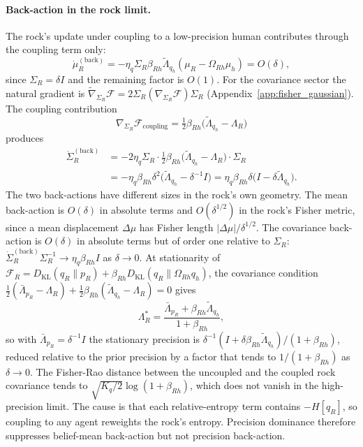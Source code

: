 \paragraph{Back-action in the rock limit.} The rock's update under coupling to a low-precision human contributes through the coupling term only:
\begin{equation}
\dot{\mu}_R^{(\mathrm{back})} = -\eta_q \Sigma_R \beta_{Rh} \tilde{\Lambda}_{q_h}(\mu_R - \Omega_{Rh}\mu_h) = O(\delta),
\label{eq:rock_back_mu}
\end{equation}
since $\Sigma_R = \delta I$ and the remaining factor is $O(1)$. For the covariance sector the natural gradient is $\tilde{\nabla}_{\Sigma_R}\mathcal{F} = 2\Sigma_R(\nabla_{\Sigma_R}\mathcal{F})\Sigma_R$ (Appendix~\ref{app:fisher_gaussian}). The coupling contribution
\begin{equation}
\nabla_{\Sigma_R}\mathcal{F}_{\mathrm{coupling}} = \tfrac{1}{2}\beta_{Rh}\big(\tilde{\Lambda}_{q_h} - \Lambda_R\big)
\end{equation}
produces
\begin{equation}
\begin{aligned}
\dot{\Sigma}_R^{(\mathrm{back})} &= -2\eta_q \Sigma_R \cdot \tfrac{1}{2}\beta_{Rh}\big(\tilde{\Lambda}_{q_h} - \Lambda_R\big)\cdot \Sigma_R \\
&= -\eta_q \beta_{Rh} \delta^2 \big(\tilde{\Lambda}_{q_h} - \delta^{-1}I\big) = \eta_q\beta_{Rh}\delta\big(I - \delta\tilde{\Lambda}_{q_h}\big).
\end{aligned}
\label{eq:rock_back_sigma}
\end{equation}
The two back-actions have different sizes in the rock's own geometry. The mean back-action is $O(\delta)$ in absolute terms and $O(\delta^{1/2})$ in the rock's Fisher metric, since a mean displacement $\Delta\mu$ has Fisher length $|\Delta\mu|/\delta^{1/2}$. The covariance back-action is $O(\delta)$ in absolute terms but of order one relative to $\Sigma_R$: $\dot{\Sigma}_R^{(\mathrm{back})}\Sigma_R^{-1} \to \eta_q\beta_{Rh}I$ as $\delta \to 0$. At stationarity of $\mathcal{F}_R = D_{\mathrm{KL}}(q_R\|p_R) + \beta_{Rh}D_{\mathrm{KL}}(q_R\|\Omega_{Rh}q_h)$, the covariance condition $\tfrac{1}{2}(\bar{\Lambda}_{p_R} - \Lambda_R) + \tfrac{1}{2}\beta_{Rh}(\tilde{\Lambda}_{q_h} - \Lambda_R) = 0$ gives
\begin{equation}
\Lambda_R^* = \frac{\bar{\Lambda}_{p_R} + \beta_{Rh}\tilde{\Lambda}_{q_h}}{1 + \beta_{Rh}},
\end{equation}
so with $\bar{\Lambda}_{p_R} = \delta^{-1}I$ the stationary precision is $\delta^{-1}(I + \delta\beta_{Rh}\tilde{\Lambda}_{q_h})/(1 + \beta_{Rh})$, reduced relative to the prior precision by a factor that tends to $1/(1 + \beta_{Rh})$ as $\delta \to 0$. The Fisher-Rao distance between the uncoupled and the coupled rock covariance tends to $\sqrt{K_q/2}\log(1 + \beta_{Rh})$, which does not vanish in the high-precision limit. The cause is that each relative-entropy term contains $-H[q_R]$, so coupling to any agent reweights the rock's entropy. Precision dominance therefore suppresses belief-mean back-action but not precision back-action.

